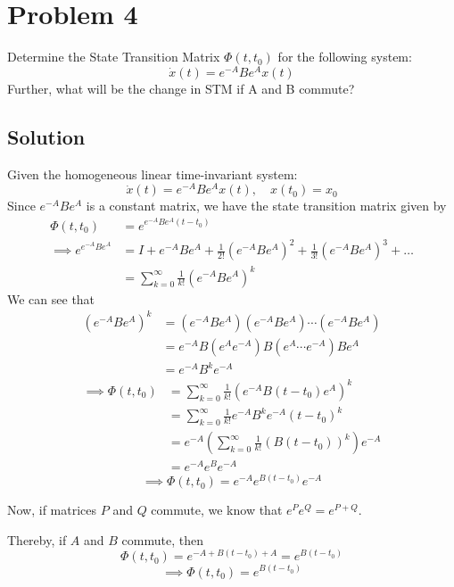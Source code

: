 \section*{Problem 4}

Determine the State Transition Matrix \( \Phi(t,t_0) \) for the following system:
\begin{equation*}
    \dot x(t)
    =
    e^{-A} B e^A x(t)
\end{equation*}
Further, what will be the change in STM if A and B commute?

\subsection*{Solution}

Given the homogeneous linear time-invariant system:
\begin{equation*}
    \dot{x}(t) = e^{-A} B e^A x(t),
    \quad
    x(t_0) = x_0
\end{equation*}
Since \( e^{-A} B e^A \) is a constant matrix, we have the state transition matrix given by
\begin{align*}
    \Phi(t, t_0)
     & =
    e^{e^{-A} B e^A (t - t_0)}
    \\
    \implies
    e^{e^{-A} B e^A}
     & =
    I + e^{-A} B e^A + \frac{1}{2!} {(e^{-A} B e^A)}^2 + \frac{1}{3!} {(e^{-A} B e^A)}^3 + \ldots
    \\ & =
    \sum_{k=0}^{\infty} \frac{1}{k!} {(e^{-A} B e^A)}^k
\end{align*}
We can see that
\begin{align*}
    {(e^{-A} B e^A)}^k
     & =
    (e^{-A} B e^A)
    (e^{-A} B e^A)
    \cdots
    (e^{-A} B e^A)
    \\ & =
    e^{-A} B (e^A
    e^{-A}) B (e^A
    \cdots
    e^{-A}) B e^A
    \\ & =
    e^{-A} B^k e^{-A}
\end{align*}
\begin{align*}
    \implies
    \Phi(t, t_0)
     & =
    \sum_{k=0}^{\infty} \frac{1}{k!} {(e^{-A} B(t - t_0) e^A)}^k
    \\ & =
    \sum_{k=0}^{\infty} \frac{1}{k!} e^{-A} B^k e^{-A} {(t - t_0)}^k
    \\ & =
    e^{-A} \left( \sum_{k=0}^{\infty} \frac{1}{k!} {\left( B(t - t_0) \right)}^k \right) e^{-A}
    \\ & =
    e^{-A} e^{B} e^{-A}
\end{align*}
\begin{equation*}
    \implies
    \boxed{
        \Phi(t, t_0)
        =
        e^{-A} e^{B(t - t_0)} e^{-A}
    }
\end{equation*}

Now, if matrices \( P \) and \( Q \) commute, we know that \( e^P e^Q = e^{P + Q} \).

Thereby, if \( A \) and \( B \) commute, then
\begin{equation*}
    \Phi(t, t_0)
    =
    e^{-A + B(t - t_0) + A}
    =
    e^{B(t - t_0)}
\end{equation*}
\begin{equation*}
    \implies
    \boxed{
        \Phi(t, t_0)
        =
        e^{B(t - t_0)}
    }
\end{equation*}

